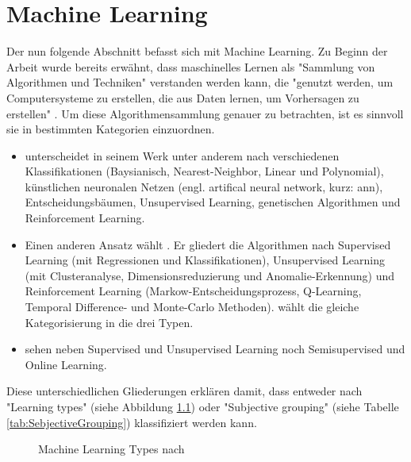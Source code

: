 \chapter{Machine Learning}\label{sec:MachineLearning}
Der nun folgende Abschnitt befasst sich mit Machine Learning. Zu Beginn der Arbeit wurde bereits erwähnt, dass maschinelles Lernen als "Sammlung von Algorithmen und Techniken" verstanden werden kann, die "genutzt werden, um Computersysteme zu erstellen, die aus Daten lernen, um Vorhersagen zu erstellen" \citep[S.~53; eigene Übersetzung]{swamynathan_mastering_2017}. Um diese Algorithmensammlung genauer zu betrachten, ist es sinnvoll sie in bestimmten Kategorien einzuordnen. 
\begin{itemize}
\item \citep{kubat_introduction_2017} unterscheidet in seinem Werk unter anderem nach verschiedenen Klassifikationen (Baysianisch, Nearest-Neighbor, Linear und Polynomial), künstlichen neuronalen Netzen (engl. artifical neural network, kurz: \gls{ann}), Entscheidungsbäumen, Unsupervised Learning, genetischen Algorithmen und Reinforcement Learning.
\item Einen anderen Ansatz wählt \citep{swamynathan_mastering_2017}. Er gliedert die Algorithmen nach Supervised Learning (mit Regressionen und Klassifikationen), Unsupervised Learning (mit Clusteranalyse, Dimensionsreduzierung und Anomalie-Erkennung) und Reinforcement Learning (Markow-Entscheidungsprozess, Q-Learning, Temporal Difference- und Monte-Carlo Methoden). \citep{kim_matlab_2017} wählt die gleiche Kategorisierung in die drei Typen.
\item \citep{paluszek_matlab_2017} sehen neben Supervised und Unsupervised Learning noch Semisupervised und Online Learning.
\end{itemize}
Diese unterschiedlichen Gliederungen erklären \citep[S.~222]{ramasubramanian_machine_2017} damit, dass entweder nach "Learning types" (siehe Abbildung \ref{fig:MachineLearningTypes_all}) oder "Subjective grouping" (siehe Tabelle \ref{tab:SebjectiveGrouping}) klassifiziert werden kann.
\begin{figure}[H]
\centering
{}
\caption{Machine Learning Types nach \citep[S.~222]{ramasubramanian_machine_2017}}
\label{fig:MachineLearningTypes_all}
\end{figure}


